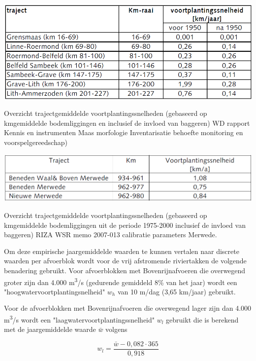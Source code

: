 \begin{table}
\includegraphics[width=\columnwidth]{figures/Tab3.png}
\caption{Overzicht trajectgemiddelde voortplantingssnelheden (gebaseerd op kmgemiddelde bodemliggingen en inclusief de invloed van baggeren) WD rapport Kennis en instrumenten Maas morfologie Inventarisatie behoefte monitoring en voorspelgereedschap)}
\label{Tab3Again}
\end{table}

\begin{table}
\includegraphics[width=\columnwidth]{figures/Tab4.png}
\caption{Overzicht trajectgemiddelde voortplantingssnelheden (gebaseerd op kmgemiddelde bodemliggingen uit de periode 1975-2000 inclusief de invloed van baggeren) RIZA WSR memo 2007-013 calibratie parameters Merwede.}
\label{Tab4}
\end{table}

Om deze empirische jaargemiddelde waarden te kunnen vertalen naar discrete waarden per afvoerblok wordt voor de vrij afstromende riviertakken de volgende benadering gebruikt.
Voor afvoerblokken met Bovenrijnafvoeren die overwegend groter zijn dan 4.000 m\textsuperscript{3}/s (gedurende gemiddeld 8\% van het jaar) wordt een "hoogwatervoortplantingsnelheid" $w_h$ van 10 m/dag (3,65 km/jaar) gebruikt.

Voor de afvoerblokken met Bovenrijnafvoeren die overwegend lager zijn dan 4.000 m\textsuperscript{3}/s wordt een "laagwatervoortplantingssnelheid" $w_l$ gebruikt die is berekend met de jaargemiddelde waarde $\bar{w}$ volgens

\begin{equation}
w_l = \frac{\bar{w} - 0,082 \cdot 365}{0,918}
\end{equation}

